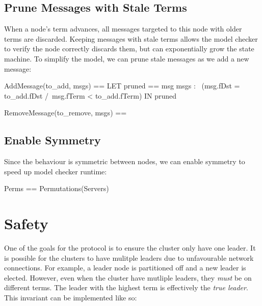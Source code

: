 \documentclass{report}
\begin{document}
\subsection{Prune Messages with Stale Terms}

When a node's term advances, all messages targeted to this node with older terms
are discarded. Keeping messages with stale terms allows the model checker to 
verify the node correctly discards them, but can exponentially grow the state
machine. To simplify the model, we can prune stale messages as we add a new 
message: \newline

\begin{tla}
AddMessage(to_add, msgs) == 
    LET 
        pruned == {msg \in msgs : 
                    ~(msg.fDst = to_add.fDst /\ msg.fTerm < to_add.fTerm)}
    IN
        pruned 

RemoveMessage(to_remove, msgs) ==
\end{tla}
\begin{tlatex}
%
%
%
%
%
\@pvspace{8.0pt}%
%
\end{tlatex}

\subsection{Enable Symmetry}

Since the behaviour is symmetric between nodes, we can enable symmetry to speed
up model checker runtime:\newline

\begin{tla}
Perms == Permutations(Servers)
\end{tla}
\begin{tlatex}
%
\end{tlatex}

\section{Safety}

One of the goals for the protocol is to ensure the cluster only have one leader.
It is possible for the clusters to have mulitple leaders due to unfavourable
network connections. For example, a leader node is partitioned off and a new
leader is elected. However, even when the cluster have mutliple leaders, they
\textit{must} be on different terms. The leader with the highest term is
effectively the \textit{true leader}. This invariant can be implemented like
so:\newline
\end{document}
